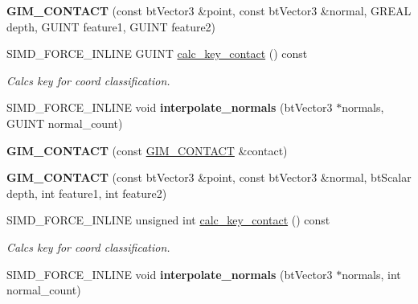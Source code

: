 \begin{DoxyCompactItemize}
\mbox{\label{classGIM__CONTACT_ac27e6b6f50d458d5400fe135d85401bb}} 
{\bfseries G\+I\+M\+\_\+\+C\+O\+N\+T\+A\+CT} (const bt\+Vector3 \&point, const bt\+Vector3 \&normal, G\+R\+E\+AL depth, G\+U\+I\+NT feature1, G\+U\+I\+NT feature2)
\item 
\mbox{\label{classGIM__CONTACT_a81c1c924eef0edf8842762068d8dafc6}} 
S\+I\+M\+D\+\_\+\+F\+O\+R\+C\+E\+\_\+\+I\+N\+L\+I\+NE G\+U\+I\+NT \hyperlink{classGIM__CONTACT_a81c1c924eef0edf8842762068d8dafc6}{calc\+\_\+key\+\_\+contact} () const
\begin{DoxyCompactList}\small\item\em Calcs key for coord classification. \end{DoxyCompactList}\item 
\mbox{\label{classGIM__CONTACT_a3f2d3d46cf49b6d1ff3f2c8299a2c3ca}} 
S\+I\+M\+D\+\_\+\+F\+O\+R\+C\+E\+\_\+\+I\+N\+L\+I\+NE void {\bfseries interpolate\+\_\+normals} (bt\+Vector3 $\ast$normals, G\+U\+I\+NT normal\+\_\+count)
\item 
\mbox{\label{classGIM__CONTACT_af2504893707107a602ccdcbf9af4c1ef}} 
{\bfseries G\+I\+M\+\_\+\+C\+O\+N\+T\+A\+CT} (const \hyperlink{classGIM__CONTACT}{G\+I\+M\+\_\+\+C\+O\+N\+T\+A\+CT} \&contact)
\item 
\mbox{\label{classGIM__CONTACT_a9ae6abf57110c866605dc775aedd022e}} 
{\bfseries G\+I\+M\+\_\+\+C\+O\+N\+T\+A\+CT} (const bt\+Vector3 \&point, const bt\+Vector3 \&normal, bt\+Scalar depth, int feature1, int feature2)
\item 
\mbox{\label{classGIM__CONTACT_a7d36aa50acfefd8276e59cc6c9cdb900}} 
S\+I\+M\+D\+\_\+\+F\+O\+R\+C\+E\+\_\+\+I\+N\+L\+I\+NE unsigned int \hyperlink{classGIM__CONTACT_a7d36aa50acfefd8276e59cc6c9cdb900}{calc\+\_\+key\+\_\+contact} () const
\begin{DoxyCompactList}\small\item\em Calcs key for coord classification. \end{DoxyCompactList}\item 
\mbox{\label{classGIM__CONTACT_a2e204397a9e74dc10df19faafc71e074}} 
S\+I\+M\+D\+\_\+\+F\+O\+R\+C\+E\+\_\+\+I\+N\+L\+I\+NE void {\bfseries interpolate\+\_\+normals} (bt\+Vector3 $\ast$normals, int normal\+\_\+count)

\end{DoxyCompactItemize}
